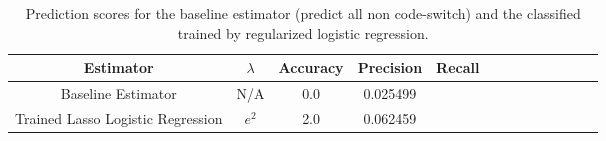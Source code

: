 \documentclass[conference]{IEEEtran}
\begin{document}
\begin{comment}
Done Loading X,Y
Done with Regression
The number of Features is  119450
Done Loading Regression Result - [All Data]
The Regression Intercept is [-4.69269572]
Done Loading X,Y
Number of features =  119450
Testing at Level 8.371704e-08
The number of cs in labels = %
baseline predictor accuracy = %
Shape of X
(756485, 119450)
Out of 119450 Features, 3311 are significant at 0.000000 level
The number of positive betas that are significant = 583
Test----------------------
\end{comment}



\begin{comment}
The Fraction of Correctly Classified Samples = 0.986583
Performance of Flat Predictor (0 for all) = 0.986133
Number of Samples = 151297
Number of Code-Switching Instances = 2098
Number of Predicting Code-Switching = 126
Precision = [ 0.98676333  0.76984127]
Recall = [ 0.99980563  0.04623451]
\begin{comment}

\begin{comment}
The Fraction of Correctly Classified Samples = 0.987587
Performance of Flat Predictor (0 for all) = 0.986133
Number of Samples = 151297
Number of Code-Switching Instances = 2098
Number of Predicting Code-Switching = 310
Precision = [ 0.98785988  0.85483871]
Recall = [ 0.99969839  0.12631077]
Fbeta Score = [ 0.99374388  0.22009967]
Support [149199   2098]
\end{comment}

\begin{table}[h!] 
 \caption{Prediction scores for the baseline estimator (predict all non code-switch) and the classified trained by regularized logistic regression. }
\centering %
\begin{tabular}{c c c c c c rrrrrrr} %
\hline\hline %
Estimator 		&		$\lambda$		&	Accuracy		&	Precision	& 	Recall	
\\ [0.5ex] 
\hline 
Baseline Estimator 			&	N/A		&	 0.0	& 	 0.025499 	&		 \\ 
Trained Lasso Logistic Regression  	&	 	$e^{2}$		&	2.0 	& 	 0.062459 	&		 \\ 
\hline %
\end{tabular} 
\label{tab:predictionScores} 
\end{table} 
\end{document}

